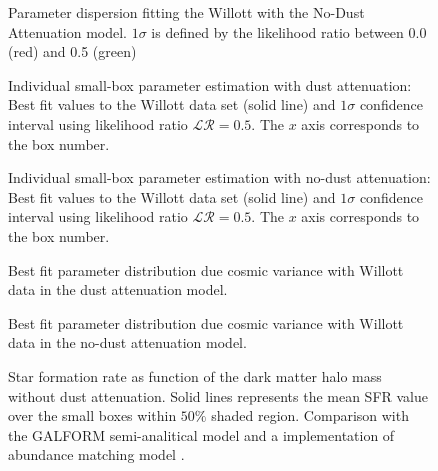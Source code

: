 \documentclass{emulateapj}
\begin{document}
\begin{figure*}
\caption{Parameter dispersion fitting the Willott with the No-Dust Attenuation model. 
$1\sigma$ is defined by the likelihood ratio between 0.0 (red) and 0.5 (green)}
\label{fig:OD1_MCMC_best_steps_wo}
\end{figure*}





\begin{figure}
\caption{Individual small-box parameter estimation with dust attenuation: Best fit values 
to the Willott data set
(solid line) and $1\sigma$ confidence interval using likelihood ratio $\mathcal{LR}= 0.5$. 
The $x$ axis corresponds to the box number.}
\label{}
\end{figure}


\begin{figure}
\caption{Individual small-box parameter estimation with no-dust attenuation: Best fit values 
to the Willott data set
(solid line) and $1\sigma$ confidence interval using likelihood ratio $\mathcal{LR}= 0.5$. 
The $x$ axis corresponds to the box number.}
\label{}
\end{figure}


\begin{figure}
\caption{Best fit parameter distribution due cosmic variance with Willott data in the dust
 attenuation model.}
\label{}
\end{figure}


\begin{figure}
\caption{Best fit parameter distribution due cosmic variance with Willott data in the no-dust
 attenuation model.}
\label{}
\end{figure}

\begin{figure}
\caption{Star formation rate as function of the dark matter halo mass without dust attenuation. 
Solid lines represents the mean SFR value over the small boxes within $50\%$  shaded region. 
Comparison with the GALFORM semi-analitical model \citep{gonzalez14} and a implementation
of abundance matching model \citep{Behroozi13}. }
\label{graph_SFR_DMHM_wo}
\end{figure}
\end{document}
